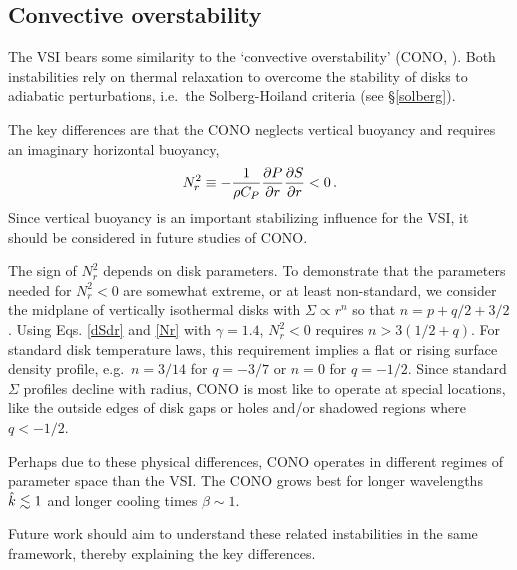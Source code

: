 

\subsection{Convective overstability}
The VSI bears some similarity to the `convective overstability'
 (CONO, \citealp{klahr14, lyra14}).   Both instabilities rely on thermal relaxation to 
overcome the stability of disks to adiabatic perturbations, i.e.\ the Solberg-Hoiland
criteria (see \S\ref{solberg}).

The key differences are that the CONO neglects vertical buoyancy
and requires an imaginary horizontal buoyancy,
\begin{align}\label{Nr}
N_r^2 \equiv -{1 \over \rho C_P}{\partial P \over \partial r} {\partial S \over \partial r} < 0\, .
\end{align}
Since vertical buoyancy is an important stabilizing influence for the VSI, it should
be considered in future studies of CONO.

The sign of $N_r^2$ depends on disk parameters.  To demonstrate that the parameters needed for $N_r^2 <0$
are somewhat extreme, or at least non-standard, we consider the midplane of vertically isothermal disks with 
$\Sigma \propto r^n$ so that $n = p+q/2 + 3/2$. Using Eqs. \ref{dSdr} and \ref{Nr} with $\gamma = 1.4$,
$N_r^2 < 0$ requires $n> 3(1/2 + q)$.  For standard disk temperature laws, this requirement implies
a flat or rising surface density profile, e.g.\ $n = 3/14$ for $q = -3/7$ or $n = 0$ for $q = -1/2$.
Since standard $\Sigma$ profiles decline with radius, CONO is most like to operate at 
special locations, like the outside edges of disk gaps or holes and/or shadowed regions where $q < -1/2$.

Perhaps due to these physical differences, CONO operates in different regimes of parameter
space than the VSI.  The CONO grows best for longer wavelengths $\hat{k} \lesssim 1$ and longer 
cooling times $\beta \sim 1$. 

Future work should aim to understand these related instabilities in the same framework, thereby 
explaining the key differences.




